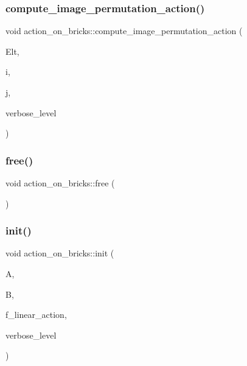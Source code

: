 \subsubsection{\texorpdfstring{compute\+\_\+image\+\_\+permutation\+\_\+action()}{compute\_image\_permutation\_action()}}
{\footnotesize\ttfamily void action\+\_\+on\+\_\+bricks\+::compute\+\_\+image\+\_\+permutation\+\_\+action (\begin{DoxyParamCaption}\item[{\mbox{\hyperlink{galois_8h_a09fddde158a3a20bd2dcadb609de11dc}{I\+NT}} $\ast$}]{Elt,  }\item[{\mbox{\hyperlink{galois_8h_a09fddde158a3a20bd2dcadb609de11dc}{I\+NT}}}]{i,  }\item[{\mbox{\hyperlink{galois_8h_a09fddde158a3a20bd2dcadb609de11dc}{I\+NT}} \&}]{j,  }\item[{\mbox{\hyperlink{galois_8h_a09fddde158a3a20bd2dcadb609de11dc}{I\+NT}}}]{verbose\+\_\+level }\end{DoxyParamCaption})}

\mbox{\label{classaction__on__bricks_aa9e87a7771150f4d46ba95e09134a8c2}} 
\subsubsection{\texorpdfstring{free()}{free()}}
{\footnotesize\ttfamily void action\+\_\+on\+\_\+bricks\+::free (\begin{DoxyParamCaption}{ }\end{DoxyParamCaption})}

\mbox{\label{classaction__on__bricks_ab45251c55c3cfb3b2f191507352d475b}} 
\subsubsection{\texorpdfstring{init()}{init()}}
{\footnotesize\ttfamily void action\+\_\+on\+\_\+bricks\+::init (\begin{DoxyParamCaption}\item[{\mbox{\hyperlink{classaction}{action}} $\ast$}]{A,  }\item[{\mbox{\hyperlink{classbrick__domain}{brick\+\_\+domain}} $\ast$}]{B,  }\item[{\mbox{\hyperlink{galois_8h_a09fddde158a3a20bd2dcadb609de11dc}{I\+NT}}}]{f\+\_\+linear\+\_\+action,  }\item[{\mbox{\hyperlink{galois_8h_a09fddde158a3a20bd2dcadb609de11dc}{I\+NT}}}]{verbose\+\_\+level }\end{DoxyParamCaption})}

